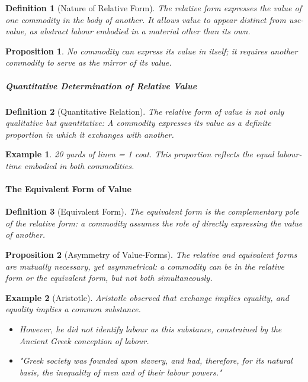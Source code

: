 \documentclass{article}
\newtheorem{innerdef}{Definition}
\newtheorem{innerprop}{Proposition}
\newtheorem{innerex}{Example}
\newenvironment{definition}{\begin{innerdef}}{\end{innerdef}}
\newenvironment{proposition}{\begin{innerprop}}{\end{innerprop}}
\newenvironment{example}{\begin{innerex}}{\end{innerex}}
\begin{document}
\begin{definition}[Nature of Relative Form]
The relative form expresses the value of one commodity in the body of another. 
It allows value to appear distinct from use-value, as abstract labour embodied in a material other than its own. 
\end{definition}

\begin{proposition}
No commodity can express its value in itself; it requires another commodity to serve as the mirror of its value.
\end {proposition}

\subparagraph{Quantitative Determination of Relative Value} %

\begin{definition}[Quantitative Relation]
The relative form of value is not only qualitative but quantitative:
A commodity expresses its value as a definite proportion in which it exchanges with another.
\end{definition}

\begin{example}
20 yards of linen = 1 coat.  
This proportion reflects the equal labour-time embodied in both commodities.
\end{example}

\newpage

\paragraph{The Equivalent Form of Value} %

\begin{definition}[Equivalent Form]
The equivalent form is the complementary pole of the relative form:
a commodity assumes the role of directly expressing the value of another.
\end{definition}

\begin{proposition}[Asymmetry of Value-Forms]
The relative and equivalent forms are mutually necessary, yet asymmetrical: 
a commodity can be in the relative form or the equivalent form, but not both simultaneously.
\end{proposition}

\begin{example}[Aristotle]
Aristotle observed that exchange implies equality, and equality implies a common substance.  
\begin{itemize}[noitemsep]
  \item However, he did not identify labour as this substance, constrained by the Ancient Greek conception of labour.
  \item "Greek society was founded upon slavery, and had, therefore, for its natural basis, the inequality of men and of their labour powers."
\end{itemize}
\end{example}
\end{document}
